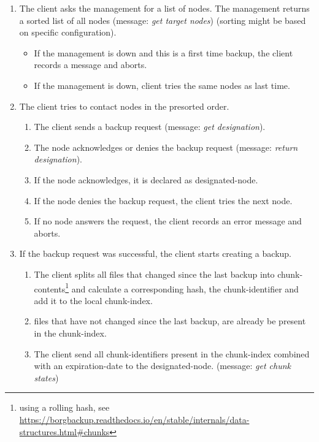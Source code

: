 \begin{enumerate}
    \item The \gls{client} asks the \gls{management} for a list of \glspl{node}. The \gls{management} returns a sorted list of all \Glspl{node} (message: \emph{get target nodes}) (sorting might be based on specific configuration).
        \begin{itemize}
            \item If the \gls{management} is down and this is a first time backup, the \gls{client} records a message and aborts.
            \item If the \gls{management} is down, \gls{client} tries the same \glspl{node} as last time.
        \end{itemize}
    \item The \gls{client} tries to contact \glspl{node} in the presorted order.
        \begin{enumerate}
            \item The \gls{client} sends a backup request (message: \emph{get designation}).
            \item The \gls{node} acknowledges or denies the backup request (message: \emph{return designation}).
            \item If the \gls{node} acknowledges, it is declared as \gls{designated-node}.
            \item If the \gls{node} denies the backup request, the \gls{client} tries the next \gls{node}.
            \item If no \gls{node} answers the request, the \gls{client} records an error message and aborts.
       \end{enumerate}
   \item If the backup request was successful, the \gls{client} starts creating a backup.
        \begin{enumerate}
            \item The \gls{client} splits all \glspl{file} that changed since the last backup into \glspl{chunk-content}\footnote{using a rolling hash, see \url{https://borgbackup.readthedocs.io/en/stable/internals/data-structures.html\#chunks}} and calculate a corresponding hash, the \gls{chunk-identifier} and add it to the local \gls{chunk-index}.
            \item \Glspl{file} that have not changed since the last backup, are already be present in the \gls{chunk-index}.
            \item The \gls{client} send all \glspl{chunk-identifier} present in the \gls{chunk-index} combined with an \gls{expiration-date} to the \gls{designated-node}. (message: \emph{get chunk states})

\end{enumerate}
\end{enumerate}
